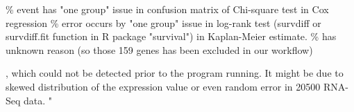 \documentclass[preprint,12pt]{elsarticle}
\newenvironment{MyIndent}
{\par\leftskip1cm\relax\rightskip1cm\relax}
{\par\leftskip0cm\relax\rightskip0cm\relax}
\newenvironment{MyColorPar}[1]{%
    \leavevmode\color{#1}\ignorespaces%
}{%
}%
\begin{document}
\begin{MyColorPar}{blue}
\begin{MyIndent}
\begin{MyColorPar}{red}
\begin{outline}
\% event has "one group" issue in confusion matrix of Chi-square test in Cox regression
\% error occurs by "one group" issue in log-rank test (survdiff or survdiff.fit function in R package "survival") in Kaplan-Meier estimate.
\% has unknown reason (so those 159 genes has been excluded in our workflow)
\end{outline}
, which could not be detected prior to the program running.
It might be due to skewed distribution of the expression value or even random error in 20500 RNA-Seq data. %
"




\end{MyColorPar} %
\end{MyIndent}

\end{MyColorPar} %
\end{document}
